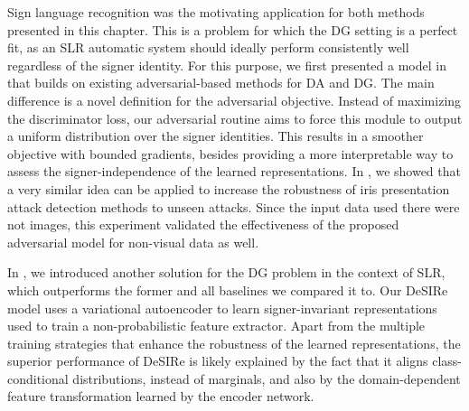 Sign language recognition was the motivating application for both methods presented in this chapter. This is a problem for which the DG setting is a perfect fit, as an SLR automatic system should ideally perform consistently well regardless of the signer identity. For this purpose, we first presented a model in  that builds on existing adversarial-based methods for DA and DG. The main difference is a novel definition for the adversarial objective. Instead of maximizing the discriminator loss, our adversarial routine aims to force this module to output a uniform distribution over the signer identities. This results in a smoother objective with bounded gradients, besides providing a more interpretable way to assess the signer-independence of the learned representations. In , we showed that a very similar idea can be applied to increase the robustness of iris presentation attack detection methods to unseen attacks. Since the input data used there were not images, this experiment validated the effectiveness of the proposed adversarial model for non-visual data as well.

In , we introduced another solution for the DG problem in the context of SLR, which outperforms the former and all baselines we compared it to. Our DeSIRe model uses a variational autoencoder to learn signer-invariant representations used to train a non-probabilistic feature extractor. Apart from the multiple training strategies that enhance the robustness of the learned representations, the superior performance of DeSIRe is likely explained by the fact that it aligns class-conditional distributions, instead of marginals, and also by the domain-dependent feature transformation learned by the encoder network.